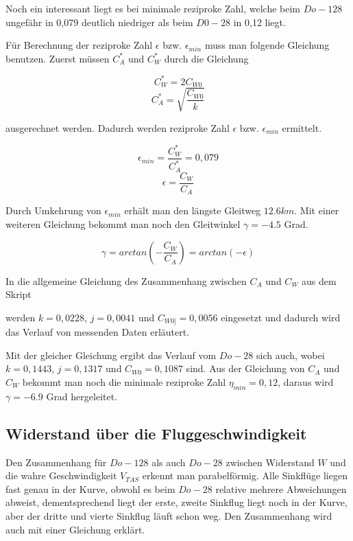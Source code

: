 Noch ein interessant liegt es bei minimale reziproke Zahl, welche beim $Do - 128$ ungefähr in 0,079 deutlich niedriger als beim $D0 - 28$ in 0,12 liegt.

Für Berechnung der reziproke Zahl $\epsilon$ bzw. $\epsilon_{min}$ muss man folgende Gleichung benutzen. Zuerst müssen $C_{A}^{*}$ und $C_{W}^{*}$ durch die Gleichung 

\begin{equation*}
C_{W}^{*} = 2 C_{W0}
\end{equation*}
\begin{equation*}
C_{A}^{*} = \sqrt{\frac{C_{W0}}{k}}
\end{equation*}

ausgerechnet werden. Dadurch werden reziproke Zahl $\epsilon$ bzw. $\epsilon_{min}$ ermittelt.

\begin{equation*}
\epsilon_{min} = \frac{C_{W}^{*}}{C_{A}^{*}} = 0,079
\end{equation*}
\begin{equation*}
\epsilon = \frac{C_{W}}{C_{A}}
\end{equation*}

Durch Umkehrung von $\epsilon_{min}$ erhält man den längste Gleitweg $12.6 km$. Mit einer weiteren Gleichung bekommt man noch den Gleitwinkel $\gamma = -4.5$ Grad.

\begin{equation*}
\gamma = arctan(-\frac{C_{W}}{C_{A}}) = arctan( -\epsilon)
\end{equation*}

In die allgemeine Gleichung des Zusammenhang zwischen $C_{A}$ und $C_{W}$ aus dem Skript  


werden $k = 0,0228$, $j = 0,0041$ und $C_{W{0]}} = 0,0056$ eingesetzt und dadurch wird das Verlauf von messenden Daten erläutert. 

Mit der gleicher Gleichung ergibt das Verlauf vom $Do - 28$ sich auch, wobei $k = 0,1443$, $j = 0,1317$ und $C_{W{0}} = 0,1087$ sind. Aus der Gleichung von $C_{A}$ und $C_{W}$ bekommt man noch die minimale reziproke Zahl $\eta_{min} = 0,12$, daraus wird $\gamma = -6.9$ Grad hergeleitet.

\subsection{Widerstand über die Fluggeschwindigkeit}
Den Zusammenhang für $Do -128$ als auch $Do - 28$ zwischen Widerstand $W$ und die wahre Geschwindigkeit $V_{TAS}$ erkennt man parabelförmig. Alle Sinkflüge liegen fast genau in der Kurve, obwohl es beim $Do -28$ relative mehrere Abweichungen abweist, dementsprechend liegt der erste, zweite Sinkflug liegt noch in der Kurve, aber der dritte und vierte Sinkflug läuft schon weg. Den Zusammenhang wird auch mit einer Gleichung erklärt.

